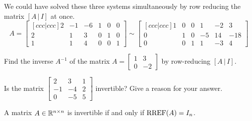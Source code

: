 \begin{applicationActivities}{3}{23}
\begin{observation}
We could have solved these three systems simultaneously
by row reducing the matrix \([A\,|\,I]\) at once.
\[
  A=\begin{bmatrix}[ccc|ccc]
    2 & -1 & -6 & 1 & 0 & 0 \\
    2 & 1 & 3 & 0 & 1 & 0 \\
    1 & 1 & 4 & 0 & 0 & 1
  \end{bmatrix} \sim
  \begin{bmatrix}[ccc|ccc]
    1 & 0 & 0 & 1 & -2 & 3 \\
    0 & 1 & 0 & -5 & 14 & -18 \\
    0 & 0 & 1 & 1 & -3 & 4
  \end{bmatrix}
\]
\end{observation}


\begin{activity}{10}
  Find the inverse \(A^{-1}\) of the matrix
  \(A=\begin{bmatrix} 1 & 3 \\ 0 & -2 \end{bmatrix}\)
  by row-reducing \([A\,|\,I]\).
\end{activity}

\begin{activity}{10}
Is the matrix $\begin{bmatrix} 2 & 3 & 1 \\ -1 & -4 & 2 \\ 0 & -5 & 5 \end{bmatrix}$ invertible? Give a reason for your answer.
\end{activity}

\begin{observation}
 A matrix $A \in \mathbb{R}^{n \times n}$ is invertible if and only if $\operatorname{RREF}(A) = I_n$.
\end{observation}

\end{applicationActivities}
